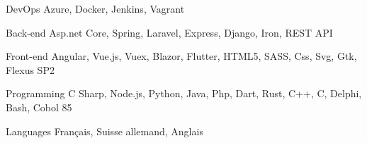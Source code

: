 

\begin{cvskills}

  \cvskill
    {DevOps} %
    {Azure, Docker, Jenkins, Vagrant} %

  \cvskill
    {Back-end} %
    {Asp.net Core, Spring, Laravel, Express, Django, Iron, REST API} %

  \cvskill
    {Front-end} %
    {Angular, Vue.js, Vuex, Blazor, Flutter, HTML5, SASS, Css, Svg, Gtk, Flexus SP2} %

  \cvskill
    {Programming} %
    {C Sharp, Node.js, Python, Java, Php, Dart, Rust, C++, C, Delphi, Bash, Cobol 85} %

  \cvskill
    {Languages} %
    {Français, Suisse allemand, Anglais} %

\end{cvskills}
